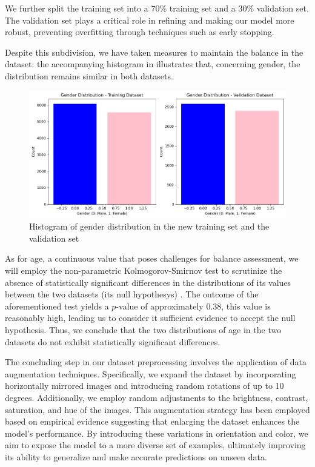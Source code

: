 We further split the training set into a $70\%$ training set and a $30\%$
validation set. The validation set plays a critical role in refining
and making our model more robust, preventing overfitting through techniques
such as early stopping.

Despite this subdivision, we have taken measures to maintain the
balance in the dataset: the accompanying histogram in  illustrates that,
concerning gender, the distribution remains similar in both datasets.

\begin{figure}[htbp]
    \centerline{\includegraphics[width=.5\textwidth]{images/dataset/gender2.png}}
    \caption{Histogram of gender distribution in the new training
    set and the validation set}
    \label{3gender2}
\end{figure}

As for age, a continuous value that poses challenges for balance
assessment, we will employ the non-parametric Kolmogorov-Smirnov test
to scrutinize the absence of statistically significant differences in
the distributions of its values between the two datasets
(its null hypothesys) \cite{app1}.
The outcome of the aforementioned test yields a $p$-value of approximately
$0.38$, this value is reasonably high,
leading us to consider it sufficient evidence to accept the null hypothesis.
Thus, we conclude that the two distributions of age in the two
datasets do not exhibit statistically significant differences.

The concluding step in our dataset preprocessing involves the application
of data augmentation techniques. Specifically, we expand the dataset
by incorporating horizontally mirrored images and introducing random
rotations of up to 10 degrees. Additionally, we employ random adjustments
to the brightness, contrast, saturation, and hue of the images.
This augmentation strategy has been employed based on empirical
evidence suggesting that enlarging the dataset enhances the model's
performance. By introducing these variations in orientation and color,
we aim to expose the model to a more diverse set of examples,
ultimately improving its ability to generalize and make accurate
predictions on unseen data.

